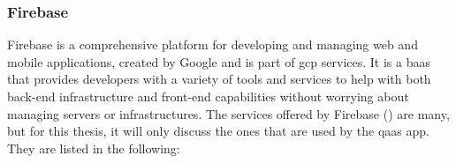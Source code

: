 \subsubsection{Firebase}
Firebase is a comprehensive platform for developing and managing web and mobile applications, created by
Google and is part of \acrshort{gcp} services. It is a \acrshort{baas} that provides developers with a
variety of tools and services to help with both back-end infrastructure and front-end capabilities without worrying
about managing servers or infrastructures. The services offered by Firebase (\textit{\cite{firebaseproducts}}) are
many, but for this thesis, it will only discuss the ones that are used by the \acrshort{qaas} app. They are listed
in the following:
